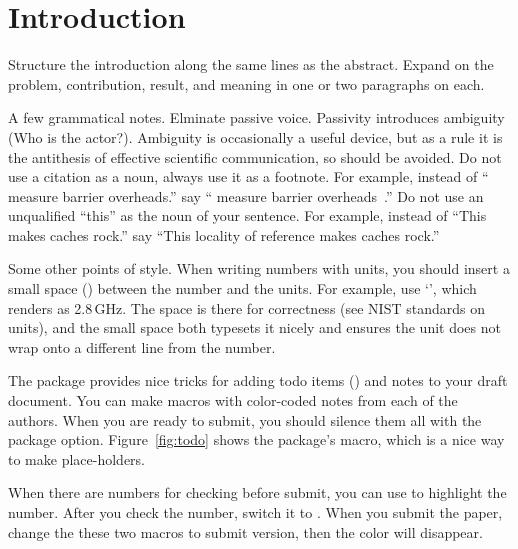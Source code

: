 \section{Introduction}

Structure the introduction along the same lines as the abstract.
Expand on the problem, contribution, result, and meaning in one or two
paragraphs on each.





A few grammatical notes.  Elminate passive voice.  Passivity
introduces ambiguity (Who is the actor?).  Ambiguity is occasionally a
useful device, but as a rule it is the antithesis of effective
scientific communication, so should be avoided.  Do not use a citation
as a noun, always use it as a footnote.  For example, instead of
``\cite{BH:04} measure barrier overheads.''  say ``\citeauthor{BH:04}
measure barrier overheads~\cite{BH:04}.''  Do not use an unqualified
``this'' as the noun of your sentence. For example, instead of ``This
makes caches rock.''  say ``This locality of reference makes caches
rock.''

Some other points of style.  When writing numbers with units, you
should insert a small space (\textjava{\\,}) between the number and
the units.  For example, use `', which renders as
2.8\,GHz.  The space is there for correctness (see NIST standards on
units), and the small space both typesets it nicely and ensures the
unit does not wrap onto a different line from the number.

The  package provides nice
 tricks for adding todo items (\textjava{\\todo}) and
notes to your draft document.  You can make macros with  color-coded notes from each of the authors.
When you are ready to submit, you should silence them all with the
 package option.  Figure~\ref{fig:todo}
shows  the package's
\textjava{\\missingfigure} macro, which is a nice way to make
place-holders.

When there are numbers for checking before submit, you can use 
to highlight the number. After you check the number, switch it to
. When you submit the paper, change the these two macros to submit
version, then the color will disappear.

